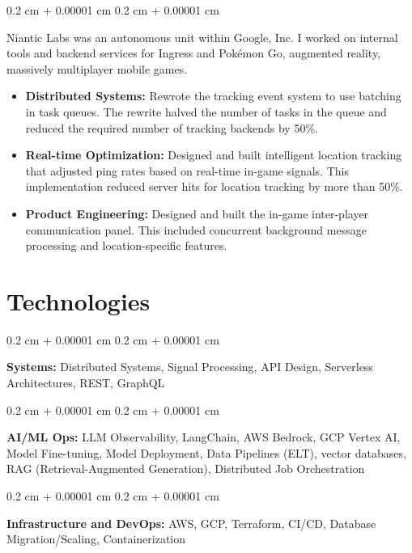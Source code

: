 \documentclass[12pt, letterpaper]{article}
\newenvironment{highlights}{
    \begin{itemize}[
        topsep=0.10 cm,
        parsep=0.10 cm,
        partopsep=0pt,
        itemsep=0pt,
        leftmargin=0.4 cm + 10pt
    ]
}{
    \end{itemize}
} %
\newenvironment{onecolentry}{
    \begin{adjustwidth}{
        0.2 cm + 0.00001 cm
    }{
        0.2 cm + 0.00001 cm
    }
}{
    \end{adjustwidth}
} %
\begin{document}
\vspace{0.10 cm}

\begin{onecolentry}
	Niantic Labs was an autonomous unit within Google, Inc. I worked on internal tools and backend services for Ingress and Pokémon Go, augmented reality, massively multiplayer mobile games.
	\begin{highlights}
		\item \textbf{Distributed Systems:} Rewrote the tracking event system to use batching in task queues. The rewrite halved the number of tasks in the queue and reduced the required number of tracking backends by 50\%.
		\item \textbf{Real-time Optimization:} Designed and built intelligent location tracking that adjusted ping rates based on real-time in-game signals. This implementation reduced server hits for location tracking by more than 50\%.
		\item \textbf{Product Engineering:} Designed and built the in-game inter-player communication panel. This included concurrent background message processing and location-specific features.
	\end{highlights}
\end{onecolentry}

\section{Technologies}
\begin{onecolentry}
	\textbf{Systems:} Distributed Systems, Signal Processing, API Design, Serverless Architectures, REST, GraphQL
\end{onecolentry}

\vspace{0.2 cm}

\begin{onecolentry}
	\textbf{AI/ML Ops:} LLM Observability, LangChain, AWS Bedrock, GCP Vertex AI, Model Fine-tuning, Model Deployment, Data Pipelines (ELT), vector databases, RAG (Retrieval-Augmented Generation), Distributed Job Orchestration
\end{onecolentry}

\vspace{0.2 cm}

\begin{onecolentry}
	\textbf{Infrastructure and DevOps:} AWS, GCP, Terraform, CI/CD, Database Migration/Scaling, Containerization
\end{onecolentry}
\end{document}
